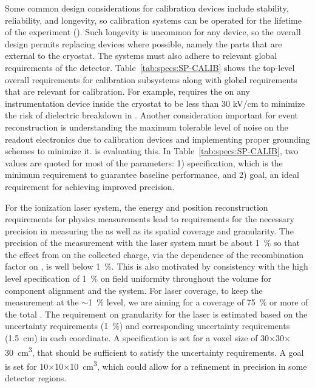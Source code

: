 

Some common design considerations for calibration devices include stability, reliability, and longevity, so calibration systems can be operated for the lifetime of the experiment (\dunelifetime). Such longevity is uncommon for any device, so the overall design permits replacing devices where possible, namely the parts that are external to the cryostat. The systems must also adhere to relevant global requirements of the  detector. Table~\ref{tab:specs:SP-CALIB} shows the top-level overall requirements for calibration subsystems along with global  requirements that are relevant for calibration. For example,  requires the \efield  on any instrumentation device inside the cryostat to be less than 30 kV/cm to minimize the risk of dielectric breakdown in . Another consideration important for event reconstruction is understanding the maximum tolerable level of noise on the readout electronics due to calibration devices and implementing proper grounding schemes to minimize it. 
 is evaluating this. In Table~\ref{tab:specs:SP-CALIB}, two values are quoted for most of the parameters: 1) specification, which is the minimum requirement to guarantee baseline performance, and 2) goal, an ideal requirement %
for achieving improved precision.

For the ionization laser system, the energy and position reconstruction requirements for physics measurements lead to requirements for the necessary precision in measuring the  \efield as well as its spatial coverage and granularity. The precision of the \efield measurement with the laser system must be about \SI{1}{\%} so that the effect from \efield on the collected charge, via the dependence of the recombination factor on \efield, is well below \SI{1}{\%}. This is also motivated by consistency with the high level  specification of \SI{1}{\%} on field uniformity throughout the volume for component alignment and the  system. For laser coverage, to keep the \efield measurement at the $\sim$\SI{1}{\%} level, we are aiming for a coverage of \SI{75}{\%} or more of the total . The requirement on granularity for the laser is estimated based on the  uncertainty requirements (\SI{1}{\%}) and corresponding uncertainty requirements (\SI{1.5}{\cm}) in each coordinate. A specification is set for a voxel size of \num{30}$\times$\num{30}$\times$\SI{30}{\cubic\cm}, that should be sufficient to satisfy the  uncertainty requirements. A goal is set for \num{10}$\times$\num{10}$\times$\SI{10}{\cubic\cm}, which could allow for a refinement in precision in some detector regions. 

